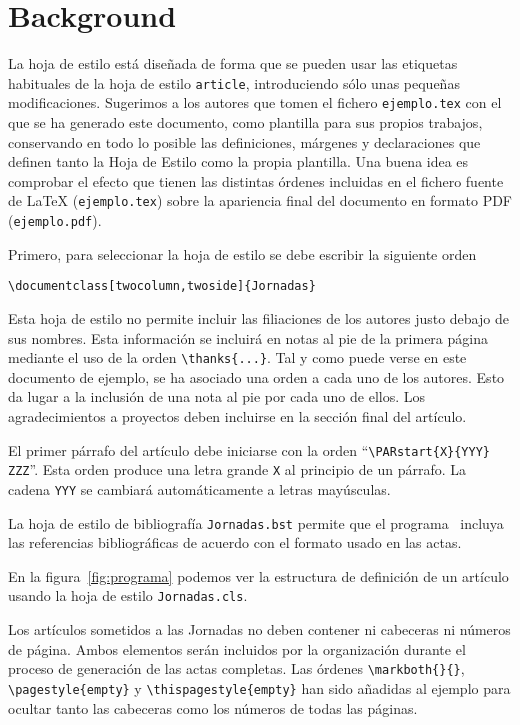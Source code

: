 \section{Background}

La hoja de estilo está diseñada de forma que se pueden usar las etiquetas
habituales de la hoja de estilo {\tt article}, introduciendo sólo unas pequeñas
modificaciones. Sugerimos a los autores que tomen el fichero {\tt ejemplo.tex}
con el que se ha generado este documento, como plantilla para sus propios
trabajos, conservando en todo lo posible las definiciones, márgenes y
declaraciones que definen tanto la Hoja de Estilo como la propia plantilla. Una
buena idea es comprobar el efecto que tienen las distintas órdenes incluidas en
el fichero fuente de \LaTeX{} ({\tt ejemplo.tex}) sobre la apariencia final del
documento en formato PDF ({\tt ejemplo.pdf}).

Primero, para seleccionar la hoja de estilo se debe escribir la siguiente orden
\begin{center}
\verb+\documentclass[twocolumn,twoside]{Jornadas}+
\end{center}

Esta hoja de estilo no permite incluir las filiaciones de los autores justo
debajo de sus nombres. Esta información se incluirá en notas al pie de la
primera página mediante el uso de la orden \verb+\thanks{...}+. Tal y como puede
verse en este documento de ejemplo, se ha asociado una orden a cada uno de los
autores. Esto da lugar a la inclusión de una nota al pie por cada uno de ellos.
Los agradecimientos a proyectos deben incluirse en la sección final del
artículo.

El primer párrafo del artículo debe iniciarse con la orden
``\verb+\PARstart{X}{YYY} ZZZ+''. Esta orden produce una letra grande \verb+X+
al principio de un párrafo. La cadena \verb+YYY+ se cambiará automáticamente a
letras mayúsculas.

La hoja de estilo de bibliografía {\tt Jornadas.bst} permite que el programa
\BibTeX\ incluya las referencias bibliográficas de acuerdo con el formato usado
en las actas.

En la figura~\ref{fig:programa} podemos ver la estructura de definición de un
artículo usando la hoja de estilo {\tt Jornadas.cls}. 
 
Los artículos sometidos a las Jornadas no deben contener ni cabeceras ni números
de página. Ambos elementos serán incluidos por la organización durante el
proceso de generación de las actas completas. Las órdenes \verb+\markboth{}{}+,
\verb+\pagestyle{empty}+ y \verb+\thispagestyle{empty}+ han sido añadidas al
ejemplo para ocultar tanto las cabeceras como los números de todas las páginas. 

